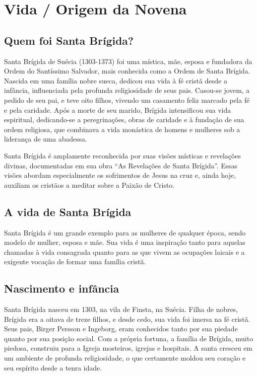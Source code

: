 \documentclass[a4paper,12pt]{extarticle} \usepackage[utf8]{inputenc}
\begin{document}
\tableofcontents
\thispagestyle{empty}

\newpage

\section{Vida / Origem da Novena}

\subsection{Quem foi Santa Brígida?}

Santa Brígida de Suécia (1303-1373) foi uma mística, mãe, esposa e fundadora da Ordem do Santíssimo Salvador, mais conhecida como a Ordem de Santa Brígida. Nascida em uma família nobre sueca, dedicou sua vida à fé cristã desde a infância, influenciada pela profunda religiosidade de seus pais. Casou-se jovem, a pedido de seu pai, e teve oito filhos, vivendo um casamento feliz marcado pela fé e pela caridade. Após a morte de seu marido, Brígida intensificou sua vida espiritual, dedicando-se a peregrinações, obras de caridade e à fundação de sua ordem religiosa, que combinava a vida monástica de homens e mulheres sob a liderança de uma abadessa.

Santa Brígida é amplamente reconhecida por suas visões místicas e revelações divinas, documentadas em sua obra “As Revelações de Santa Brígida”. Essas visões abordam especialmente os sofrimentos de Jesus na cruz e, ainda hoje, auxiliam os cristãos a meditar sobre a Paixão de Cristo.

\subsection{A vida de Santa Brígida}

Santa Brígida é um grande exemplo para as mulheres de qualquer época, sendo modelo de mulher, esposa e mãe. Sua vida é uma inspiração tanto para aquelas chamadas à vida consagrada quanto para as que vivem as ocupações laicais e a exigente vocação de formar uma família cristã.


\subsection{Nascimento e infância}

Santa Brígida nasceu em 1303, na vila de Finsta, na Suécia. Filha de nobres, Brígida era a oitava de treze filhos, e desde cedo, sua vida foi imersa na fé cristã. Seus pais, Birger Persson e Ingeborg, eram conhecidos tanto por sua piedade quanto por sua posição social. Com a própria fortuna, a família de Brígida, muito piedosa, construiu para a Igreja mosteiros, igrejas e hospitais. A santa cresceu em um ambiente de profunda religiosidade, o que certamente moldou seu coração e seu espírito desde a tenra idade.
\end{document}
